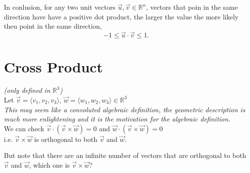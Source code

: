 \documentclass{report}
\begin{document}
    \\
    \\
 \clearpage
 In conlusion, for any two unit vectors $ \vec{ u} , \vec{ v} \in \mathbb{R} ^{n}$, vectors that poin in the same direction have have a positive dot product, the larger the value the more likely theu point in the same direction, 
 \[
 -1 \leq \vec{ u} \cdot \vec{ v} \leq 1
 .\] 
 \section{Cross Product }
 \textit{(only defined in $\mathbb{R}^{3}$)}\\
 Let $\vec{v} = \langle v_1,v_2,v_3  \rangle $, $\vec{w} = \langle w_1,w_2,w_3  \rangle  \in \mathbb{R} ^3$  \\
   \textit{ This may seem like a convoluted algebraic definition, the geometric description is much more enlightening and it is the motivation for the algebraic definition.}\\
   We can check $ \vec{ v} \cdot  \left( \vec{ v} \times  \vec{ w}  \right) = 0$ and $ \vec{ w} \cdot  \left( \vec{ v} \times  \vec{ w}  \right) =0$ \\
   i.e. $ \vec{ v} \times  \vec{ w} $ is orthogonal to both $ \vec{ v} $ and $ \vec{ w} $.\\
   \raggedcolumns
   \begin{multicols}{2}
   
   \break
    But note that there are an infinite number of vectors that are orthogonal to both $ \vec{ v} $ and $ \vec{ w} $, which one is $ \vec{ v} \times  \vec{ w} $?\\
   \end{multicols}
\end{document}
